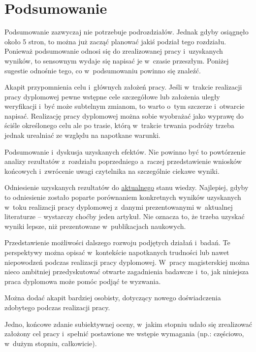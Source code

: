\chapter{Podsumowanie}
\label{ch:podsumowanie}

Podsumowanie zazwyczaj nie potrzebuje podrozdziałów. Jednak gdyby osiągnęło około 5 stron, to można już zacząć planować jakiś podział tego rozdziału. Ponieważ podsumowanie odnosi się do zrealizowanej pracy i~uzyskanych wyników, to sensownym wydaje się napisać je w~czasie przeszłym. Poniżej sugestie odnośnie tego, co w~podsumowaniu powinno się znaleźć.

Akapit przypomnienia celu i~głównych założeń pracy. Jeśli w~trakcie realizacji pracy dyplomowej pewne wstępne cele szczegółowe lub założenia uległy weryfikacji i~być może subtelnym zmianom, to warto o~tym szczerze i~otwarcie napisać. Realizację pracy dyplomowej można sobie wyobrażać jako wyprawę do ściśle określonego celu ale po trasie, którą w~trakcie trwania podróży trzeba jednak urealniać ze względu na napotkane warunki.

Podsumowanie i~dyskusja uzyskanych efektów. Nie powinno być to powtórzenie analizy rezultatów z~rozdziału poprzedniego a~raczej przedstawienie wniosków końcowych i~zwrócenie uwagi czytelnika na szczególnie ciekawe wyniki.

Odniesienie uzyskanych rezultatów do \underline{aktualnego} stanu wiedzy. Najlepiej, gdyby to odniesienie zostało poparte porównaniem konkretnych wyników uzyskanych w~toku realizacji pracy dyplomowej z~danymi prezentowanymi w~aktualnej literaturze -- wystarczy choćby jeden artykuł. Nie oznacza to, że trzeba uzyskać wyniki lepsze, niż prezentowane w~publikacjach naukowych.

Przedstawienie możliwości dalszego rozwoju podjętych działań i~badań. Te perspektywy można opisać w~kontekście napotkanych trudności lub nawet niepowodzeń podczas realizacji pracy dyplomowej. W~pracy magisterskiej można nieco ambitniej przedyskutować otwarte zagadnienia badawcze i~to, jak niniejsza praca dyplomowa może pomóc podjąć te wyzwania.

Można dodać akapit bardziej osobisty, dotyczący nowego doświadczenia zdobytego podczas realizacji pracy.

Jedno, końcowe zdanie subiektywnej oceny, w~jakim stopniu udało się zrealizować założony cel pracy i~spełnić postawione we wstępie wymagania (np.: częściowo, w~dużym stopniu, całkowicie).